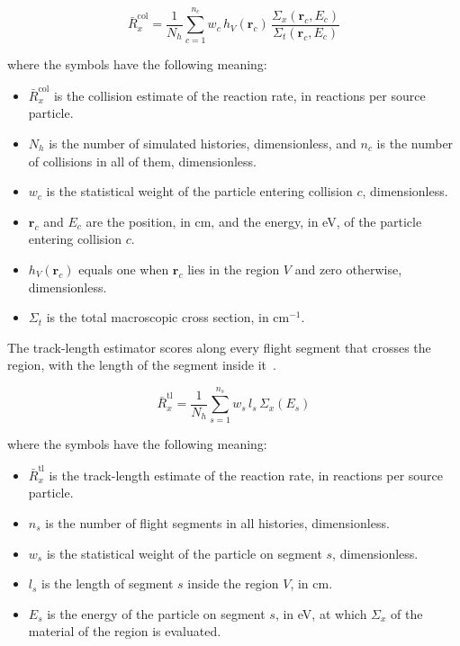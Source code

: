 \begin{equation}
\bar{R}_x^\mathrm{col} = \frac{1}{N_h} \sum_{c=1}^{n_c} w_c\,
h_V(\mathbf{r}_c)\,
\frac{\Sigma_x(\mathbf{r}_c,E_c)}{\Sigma_t(\mathbf{r}_c,E_c)}
\label{eq:mc-col}
\end{equation}

\noindent where the symbols have the following meaning:

\begin{itemize}
  \item $\bar{R}_x^\mathrm{col}$ is the collision estimate of the
        reaction rate, in reactions per source particle.

  \item $N_h$ is the number of simulated histories, dimensionless, and
        $n_c$ is the number of collisions in all of them, dimensionless.

  \item $w_c$ is the statistical weight of the particle entering
        collision $c$, dimensionless.

  \item $\mathbf{r}_c$ and $E_c$ are the position, in cm, and the energy,
        in eV, of the particle entering collision $c$.

  \item $h_V(\mathbf{r}_c)$ equals one when $\mathbf{r}_c$ lies in the
        region $V$ and zero otherwise, dimensionless.

  \item $\Sigma_t$ is the total macroscopic cross section, in cm$^{-1}$.
\end{itemize}

The track-length estimator scores along every flight segment that
crosses the region, with the length of the segment inside
it~\cite{lux_koblinger_1991}.

\begin{equation}
\bar{R}_x^\mathrm{tl} = \frac{1}{N_h} \sum_{s=1}^{n_s} w_s\, l_s\,
\Sigma_x(E_s)
\label{eq:mc-tl}
\end{equation}

\noindent where the symbols have the following meaning:

\begin{itemize}
  \item $\bar{R}_x^\mathrm{tl}$ is the track-length estimate of the
        reaction rate, in reactions per source particle.

  \item $n_s$ is the number of flight segments in all histories,
        dimensionless.

  \item $w_s$ is the statistical weight of the particle on segment $s$,
        dimensionless.

  \item $l_s$ is the length of segment $s$ inside the region $V$, in cm.

  \item $E_s$ is the energy of the particle on segment $s$, in eV, at
        which $\Sigma_x$ of the material of the region is evaluated.
\end{itemize}

